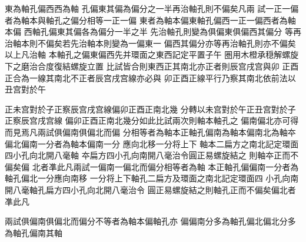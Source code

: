 \begin{正文}
\par
東為軸孔偏西西為軸
孔偏東其偏為偏分之一半再治軸孔則不偏矣凡兩
試一正一偏者為軸本與軸孔之偏分相等一正一偏
東者為軸本偏東軸孔偏西一正一偏西者為軸本偏
西軸孔偏東其偏各為偏分一半之半
先治軸孔則變為俱偏東俱偏西其偏分
等再治軸本則不偏矣若先治軸本則變為一偏東一
偏西其偏分亦等再治軸孔則亦不偏矣以上凡治軸
本軸孔之偏東偏西先并環面之東西記定平置子午
圏用木橙承穏解螺旋下之磨治合度復結螺旋立置
比試皆合則東西正其南北亦正者則辰宫戌宫與卯
正酉正合為一線其南北不正者辰宫戌宫線亦必與
卯正酉正線平行乃察其南北依前法以丑宫對於午
\par
正未宫對於子正察辰宫戌宫線偏卯正酉正南北幾
分轉以未宫對於午正丑宫對於子正察辰宫戌宫線
偏卯正酉正南北幾分如此比試兩次則軸本軸孔之
偏南偏北亦可得而見焉凡兩試俱偏南俱偏北而偏
分相等者為軸本正軸孔偏南為軸本偏南北為軸夲
偏北偏南一分者為軸本偏南一分
應向北移一分将上下
軸本二扁方之南北記定環面四小孔向北開八毫軸
夲扁方四小孔向南開八毫治令圓正易螺旋結之
則軸夲正而不偏矣偏
北者凖此凡兩試一偏南一偏北而偏分相等者為軸
本正軸孔偏偏南一分者為軸孔偏北一分應向南移
一分将上下軸孔二扁方及環面之南北記定環面四
小孔向南開八毫軸孔扁方四小孔向北開八毫治令
圓正易螺旋結之則軸孔正而不偏矣偏北者凖此凡
\par
兩試俱偏南俱偏北而偏分不等者為軸本偏軸孔亦
偏偏南分多為軸孔偏北偏北分多為軸孔偏南其軸

\end{正文}
